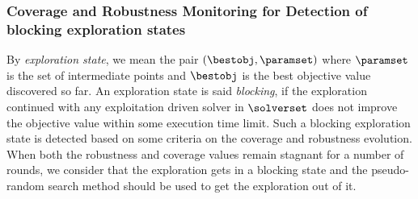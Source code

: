 \subsubsection*{Coverage and Robustness Monitoring for Detection of blocking exploration states}
By {\em exploration state}, we mean the pair $(\bestobj, \paramset)$ where $\paramset$ is the set of intermediate points and $\bestobj$ is the best objective value discovered so far. An exploration state is said {\em blocking}, if the exploration continued with any exploitation driven solver in $\solverset$ does not improve the objective value within some execution time limit. Such a blocking exploration state is detected based on some criteria on the coverage and robustness evolution. When both the robustness and coverage values remain stagnant for a number of rounds, we consider that the exploration gets in a blocking state and the pseudo-random search method should be used to get the exploration out of it.


